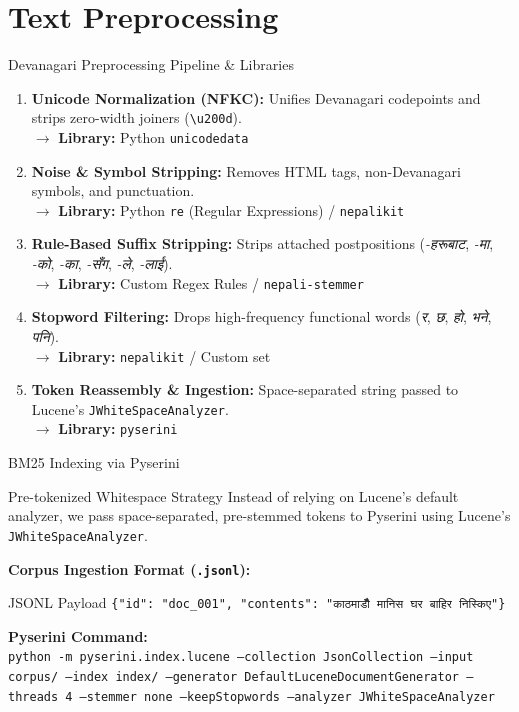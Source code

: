 \documentclass[aspectratio=169]{beamer}
\begin{document}
\section{Text Preprocessing}
\begin{frame}{Devanagari Preprocessing Pipeline \& Libraries}
  \begin{enumerate}
    \item \textbf{Unicode Normalization (NFKC):} Unifies Devanagari codepoints and strips zero-width joiners (\texttt{\textbackslash u200d}). \\
          $\rightarrow$ \textbf{Library:} Python \texttt{unicodedata}
    \item \textbf{Noise \& Symbol Stripping:} Removes HTML tags, non-Devanagari symbols, and punctuation. \\
          $\rightarrow$ \textbf{Library:} Python \texttt{re} (Regular Expressions) / \texttt{nepalikit}
    \item \textbf{Rule-Based Suffix Stripping:} Strips attached postpositions (\textit{-हरूबाट}, \textit{-मा}, \textit{-को}, \textit{-का}, \textit{-सँग}, \textit{-ले}, \textit{-लाई}). \\
          $\rightarrow$ \textbf{Library:} Custom Regex Rules / \texttt{nepali-stemmer}
    \item \textbf{Stopword Filtering:} Drops high-frequency functional words (\textit{र}, \textit{छ}, \textit{हो}, \textit{भने}, \textit{पनि}). \\
          $\rightarrow$ \textbf{Library:} \texttt{nepalikit} / Custom set
    \item \textbf{Token Reassembly \& Ingestion:} Space-separated string passed to Lucene's \texttt{JWhiteSpaceAnalyzer}. \\
          $\rightarrow$ \textbf{Library:} \texttt{pyserini}
  \end{enumerate}
\end{frame}

\begin{frame}{BM25 Indexing via Pyserini}
  \begin{block}{Pre-tokenized Whitespace Strategy}
    Instead of relying on Lucene's default analyzer, we pass space-separated, pre-stemmed tokens to Pyserini using Lucene's \texttt{JWhiteSpaceAnalyzer}.
  \end{block}
  \vspace{0.3cm}
  \textbf{Corpus Ingestion Format (\texttt{.jsonl}):}
  \begin{exampleblock}{JSONL Payload}
    \texttt{\{"id": "doc\_001", "contents": "काठमाडौँ मानिस घर बाहिर निस्किए"\}}
  \end{exampleblock}
  \vspace{0.2cm}
  \textbf{Pyserini Command:} \\
  \texttt{\small python -m pyserini.index.lucene --collection JsonCollection --input corpus/ --index index/ --generator DefaultLuceneDocumentGenerator --threads 4 --stemmer none --keepStopwords --analyzer JWhiteSpaceAnalyzer}
\end{frame}
\end{document}

